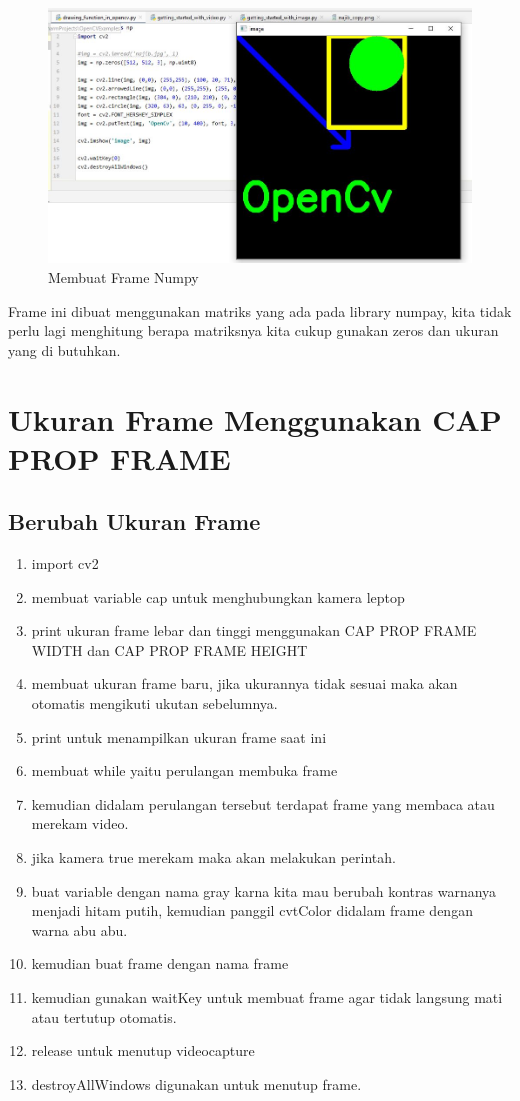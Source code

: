 \begin{figure}[ht]
\centering
\includegraphics[scale=0.5]{figures/2,15.jpg}
\caption{Membuat Frame Numpy}
\label{contoh}
\end{figure}

Frame ini dibuat menggunakan matriks yang ada pada library numpay, kita tidak perlu lagi menghitung berapa matriksnya kita cukup gunakan zeros dan ukuran yang di butuhkan.

\newpage
\section{Ukuran Frame Menggunakan CAP PROP FRAME}
\subsection{Berubah Ukuran Frame}

\begin{enumerate}
	\item import cv2
	\item membuat variable cap untuk menghubungkan kamera leptop
	\item print ukuran frame lebar dan tinggi menggunakan CAP PROP FRAME WIDTH dan CAP PROP FRAME HEIGHT
	\item membuat ukuran frame baru, jika ukurannya tidak sesuai maka akan otomatis mengikuti ukutan sebelumnya.
	\item print untuk menampilkan ukuran frame saat ini
	\item membuat while yaitu perulangan membuka frame
	\item kemudian didalam perulangan tersebut terdapat frame yang membaca atau merekam video.
	\item jika kamera true merekam maka akan melakukan perintah. 
	\item buat variable dengan nama gray karna kita mau berubah kontras warnanya menjadi hitam putih, kemudian panggil cvtColor didalam frame dengan warna abu abu.
	\item kemudian buat frame dengan nama frame
	\item kemudian gunakan waitKey untuk membuat frame agar tidak langsung mati atau tertutup otomatis.
	\item release untuk menutup videocapture
	\item destroyAllWindows digunakan untuk menutup frame.
\end{enumerate}

